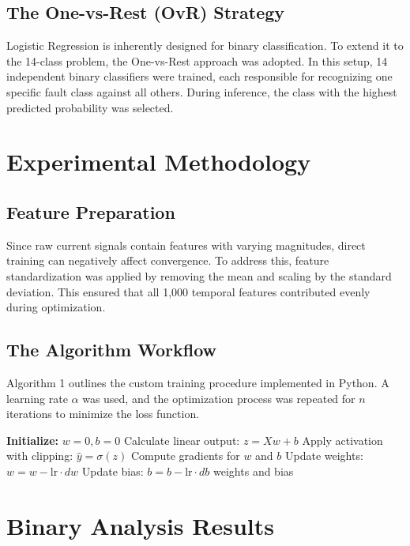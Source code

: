 \documentclass[conference]{IEEEtran}
\begin{document}
\subsection{The One-vs-Rest (OvR) Strategy}
Logistic Regression is inherently designed for binary classification. To extend it to the 14-class problem, the One-vs-Rest approach was adopted. In this setup, 14 independent binary classifiers were trained, each responsible for recognizing one specific fault class against all others. During inference, the class with the highest predicted probability was selected.

\section{Experimental Methodology}

\subsection{Feature Preparation}
Since raw current signals contain features with varying magnitudes, direct training can negatively affect convergence. To address this, feature standardization was applied by removing the mean and scaling by the standard deviation. This ensured that all 1,000 temporal features contributed evenly during optimization.

\subsection{The Algorithm Workflow}
Algorithm 1 outlines the custom training procedure implemented in Python. A learning rate $\alpha$ was used, and the optimization process was repeated for $n$ iterations to minimize the loss function.

\begin{algorithm}
\caption{My Custom LR Training Loop}
\begin{algorithmic}[1]
\STATE \textbf{Initialize:} $w = 0, b = 0$
\STATE Calculate linear output: $z = Xw + b$
\STATE Apply activation with clipping: $\hat{y} = \sigma(z)$
\STATE Compute gradients for $w$ and $b$
\STATE Update weights: $w = w - \text{lr} \cdot dw$
\STATE Update bias: $b = b - \text{lr} \cdot db$
\ENDFOR
\RETURN weights and bias
\end{algorithmic}
\end{algorithm}

\section{Binary Analysis Results}
\end{document}
